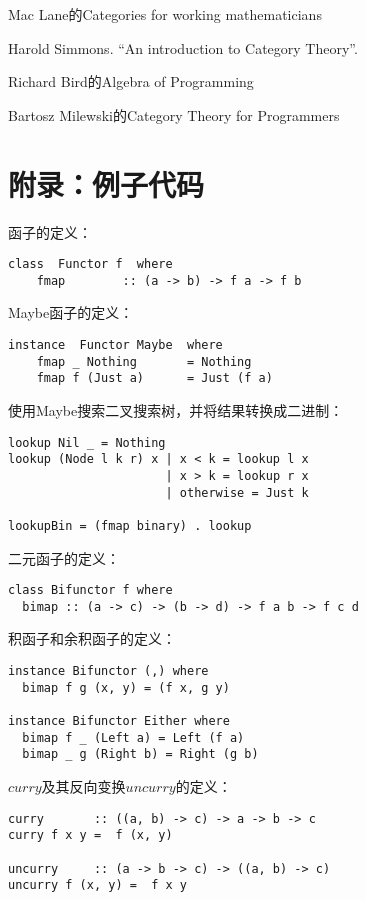 \documentclass{article}
\begin{document}

Mac Lane的Categories for working mathematicians

Harold Simmons. ``An introduction to Category Theory''.

Richard Bird的Algebra of Programming

Bartosz Milewski的Category Theory for Programmers

\section{附录：例子代码}

函子的定义：

\lstset{frame=single}
\begin{lstlisting}[style=Haskell]
class  Functor f  where
    fmap        :: (a -> b) -> f a -> f b
\end{lstlisting}

Maybe函子的定义：

\begin{lstlisting}
instance  Functor Maybe  where
    fmap _ Nothing       = Nothing
    fmap f (Just a)      = Just (f a)
\end{lstlisting}

使用Maybe搜索二叉搜索树，并将结果转换成二进制：

\begin{lstlisting}[style=Haskell]
lookup Nil _ = Nothing
lookup (Node l k r) x | x < k = lookup l x
                      | x > k = lookup r x
                      | otherwise = Just k

lookupBin = (fmap binary) . lookup
\end{lstlisting}

二元函子的定义：

\begin{lstlisting}
class Bifunctor f where
  bimap :: (a -> c) -> (b -> d) -> f a b -> f c d
\end{lstlisting}

积函子和余积函子的定义：

\begin{lstlisting}
instance Bifunctor (,) where
  bimap f g (x, y) = (f x, g y)

instance Bifunctor Either where
  bimap f _ (Left a) = Left (f a)
  bimap _ g (Right b) = Right (g b)
\end{lstlisting}

$curry$及其反向变换$uncurry$的定义：

\begin{lstlisting}
curry       :: ((a, b) -> c) -> a -> b -> c
curry f x y =  f (x, y)

uncurry     :: (a -> b -> c) -> ((a, b) -> c)
uncurry f (x, y) =  f x y
\end{lstlisting}
\end{document}
